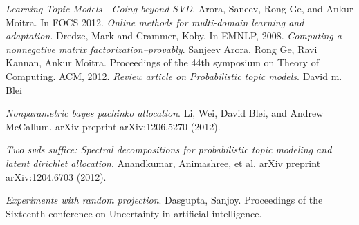 \documentclass[a4paper,11pt]{article}
\begin{document}
\begin{thebibliography}{99}
 \textit{Learning Topic Models---Going beyond SVD}. Arora, Saneev, Rong Ge, and Ankur Moitra. In FOCS 2012.
 \textit{Online methods for multi-domain learning and adaptation}. Dredze, Mark and Crammer, Koby. In
EMNLP, 2008.
 \textit{Computing a nonnegative matrix factorization--provably}. Sanjeev Arora, Rong Ge, Ravi Kannan, Ankur Moitra. Proceedings of the 44th symposium on Theory of Computing. ACM, 2012.  
 \textit{Review article on Probabilistic topic models}. David m. Blei  

 \textit{Nonparametric bayes pachinko allocation}. Li, Wei, David Blei, and Andrew McCallum. arXiv preprint arXiv:1206.5270 (2012). 

 \textit{Two svds suffice: Spectral decompositions for probabilistic topic modeling and latent dirichlet allocation}. Anandkumar, Animashree, et al.  arXiv preprint arXiv:1204.6703 (2012).

 \textit{Experiments with random projection}. Dasgupta, Sanjoy. Proceedings of the Sixteenth conference on Uncertainty in artificial intelligence.


\end{thebibliography}

\pagebreak
\end{document}
